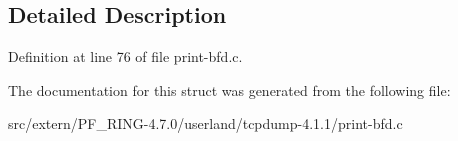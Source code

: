 \subsection{Detailed Description}


Definition at line 76 of file print-\/bfd.c.



The documentation for this struct was generated from the following file:\begin{DoxyCompactItemize}
\item 
src/extern/PF\_\-RING-\/4.7.0/userland/tcpdump-\/4.1.1/print-\/bfd.c\end{DoxyCompactItemize}
